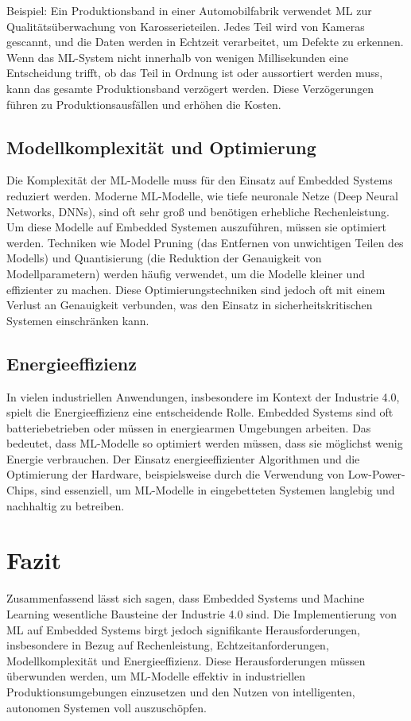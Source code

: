 Beispiel: Ein Produktionsband in einer Automobilfabrik verwendet ML zur Qualitätsüberwachung von Karosserieteilen. Jedes Teil wird von Kameras gescannt, und die Daten werden in Echtzeit verarbeitet, um Defekte zu erkennen. Wenn das ML-System nicht innerhalb von wenigen Millisekunden eine Entscheidung trifft, ob das Teil in Ordnung ist oder aussortiert werden muss, kann das gesamte Produktionsband verzögert werden. Diese Verzögerungen führen zu Produktionsausfällen und erhöhen die Kosten.

\subsection{Modellkomplexität und Optimierung}

Die Komplexität der ML-Modelle muss für den Einsatz auf Embedded Systems reduziert werden. Moderne ML-Modelle, wie tiefe neuronale Netze (Deep Neural Networks, DNNs), sind oft sehr groß und benötigen erhebliche Rechenleistung. Um diese Modelle auf Embedded Systemen auszuführen, müssen sie optimiert werden. Techniken wie Model Pruning (das Entfernen von unwichtigen Teilen des Modells) und Quantisierung (die Reduktion der Genauigkeit von Modellparametern) werden häufig verwendet, um die Modelle kleiner und effizienter zu machen. Diese Optimierungstechniken sind jedoch oft mit einem Verlust an Genauigkeit verbunden, was den Einsatz in sicherheitskritischen Systemen einschränken kann.

\subsection{Energieeffizienz}

In vielen industriellen Anwendungen, insbesondere im Kontext der Industrie 4.0, spielt die Energieeffizienz eine entscheidende Rolle. Embedded Systems sind oft batteriebetrieben oder müssen in energiearmen Umgebungen arbeiten. Das bedeutet, dass ML-Modelle so optimiert werden müssen, dass sie möglichst wenig Energie verbrauchen. Der Einsatz energieeffizienter Algorithmen und die Optimierung der Hardware, beispielsweise durch die Verwendung von Low-Power-Chips, sind essenziell, um ML-Modelle in eingebetteten Systemen langlebig und nachhaltig zu betreiben.

\section{Fazit}

Zusammenfassend lässt sich sagen, dass Embedded Systems und Machine Learning wesentliche Bausteine der Industrie 4.0 sind. Die Implementierung von ML auf Embedded Systems birgt jedoch signifikante Herausforderungen, insbesondere in Bezug auf Rechenleistung, Echtzeitanforderungen, Modellkomplexität und Energieeffizienz. Diese Herausforderungen müssen überwunden werden, um ML-Modelle effektiv in industriellen Produktionsumgebungen einzusetzen und den Nutzen von intelligenten, autonomen Systemen voll auszuschöpfen.
